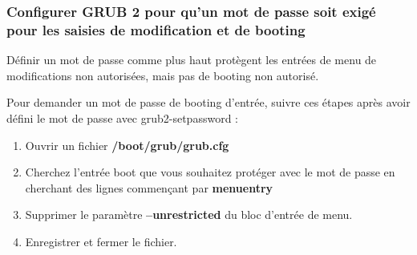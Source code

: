 \documentclass[12pt,a4paper]{article}
\begin{document}
        \subsubsection{Configurer GRUB 2 pour qu'un mot de passe soit exigé pour les saisies de modification et de booting}
        \begin{flushleft}
            \noindent Définir un mot de passe comme plus haut protègent les entrées de menu de modifications non autorisées, mais pas de booting non autorisé. 
            \item Pour demander un mot de passe de booting d'entrée, suivre ces étapes après avoir défini le mot de passe avec grub2-setpassword :
            \begin{enumerate}
                \item Ouvrir un fichier \textbf{/boot/grub/grub.cfg}
                \item Cherchez l'entrée boot que vous souhaitez protéger avec le mot de passe en cherchant des lignes commençant par \textbf{menuentry}
                \item Supprimer le paramètre \textbf{--unrestricted} du bloc d'entrée de menu.
                \item Enregistrer et fermer le fichier.
            \end{enumerate}
        \end{flushleft}
        
\end{document}
